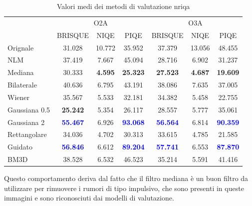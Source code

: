 \documentclass[../main.tex]{subfiles}
\begin{document}
\begin{table}[h]
	\centering
	\begin{tabular}{l||ccc||ccc}
					  & \multicolumn{3}{c||}{O2A} & \multicolumn{3}{c}{O3A} \\
		              & BRISQUE & NIQE & PIQE     & BRISQUE & NIQE  & PIQE\\ \hline\hline
		Orignale      & 31.028 & 10.772 & 35.952  & 37.379 & 13.056 & 48.455 \\
		NLM           & 37.419 & 7.667 & 45.094   & 28.716 & 6.902  & 31.237 \\
		Mediana       & 30.333 & \textbf{4.595} & \textbf{25.323}   & \textbf{27.523} & \textbf{4.687}  & \textbf{19.609} \\
		Bilaterale    & 40.636 & 6.795 & 43.191   & 38.086 & 7.635  & 37.005 \\
		Wiener        & 35.567 & 5.533 & 32.181   & 34.382 & 5.458  & 22.755 \\
		Gaussiana 0.5 & \textbf{25.242} & 5.354 & 26.117   & 28.557 & 5.777  & 35.061 \\
		Gaussiana 2   & \textcolor{blue}{\textbf{55.467}} & 6.926 & \textcolor{blue}{\textbf{93.068}}   & \textcolor{blue}{\textbf{56.564}} & 6.814  & \textcolor{blue}{\textbf{90.359}} \\
		Rettangolare  & 34.036 & 4.702 & 30.313   & 33.615 & 4.785  & 21.585 \\
		Guidato       & \textcolor{blue}{\textbf{56.846}} & 6.612 & \textcolor{blue}{\textbf{89.204}}   & \textcolor{blue}{\textbf{57.741}} & 6.553  & \textcolor{blue}{\textbf{87.870}} \\
		BM3D          & 38.528 & 6.532 & 46.523   & 35.214 & 5.591  & 41.416
	\end{tabular}
	\caption[Valori medi dei metodi di valutazione NR-IQA]{
		Valori medi dei metodi di valutazione \acrshort{nriqa}}
\end{table}

Questo comportamento deriva dal fatto che il filtro mediana è un buon filtro da utilizzare per rimuovere i rumori di tipo impulsivo, che sono presenti in queste immagini e sono riconosciuti dai modelli di valutazione.\medskip
\end{document}
